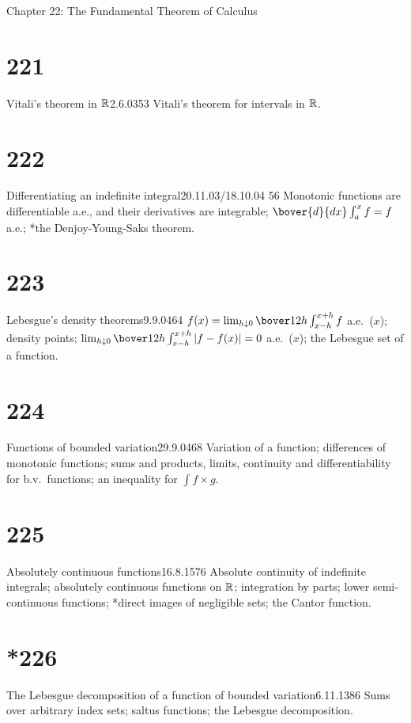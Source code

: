 
Chapter 22:  The Fundamental Theorem of Calculus


\section{221}{Vitali's theorem in $\Bbb{R}$}{2.6.03}{53}{}
{Vitali's theorem for intervals in $\Bbb{R}$.}

\section{222}{Differentiating an indefinite integral}{20.11.03/18.10.04}
{56}{}
{Monotonic functions are differentiable a.e., and their
derivatives are integrable;  $\bover{d}{dx}\int_a^xf=f$ a.e.;
*the Denjoy-Young-Saks theorem.}

\section{223}{Lebesgue's density theorems}{9.9.04}{64}{}
{$f(x)=\lim_{h{\downarrow}0}\bover1{2h}\int_{x-h}^{x+h}f$ a.e.\ ($x$);
density points;
$\lim_{h{\downarrow}0}\bover1{2h}\int_{x-h}^{x+h}|f-f(x)|=0$ a.e.\ ($x$);
the Lebesgue set of a function.}

\section{224}{Functions of bounded variation}{29.9.04}{68}{}
{Variation of a function;  differences of monotonic functions;
sums and products, limits, continuity and differentiability for b.v.\
functions;  an inequality for ${\int}f{\times}g$.}

\section{225}{Absolutely continuous functions}{16.8.15}{76}{}
{Absolute continuity of indefinite integrals;  absolutely
continuous functions on $\Bbb{R}$;  integration by parts;  lower
semi-continuous functions;  *direct images of negligible sets;  the
Cantor function.}

\section{*226}{The Lebesgue decomposition of a function of bounded
variation}{6.11.13}{86}{}
{Sums over arbitrary index sets;  saltus functions;  the Lebesgue
decomposition.}

